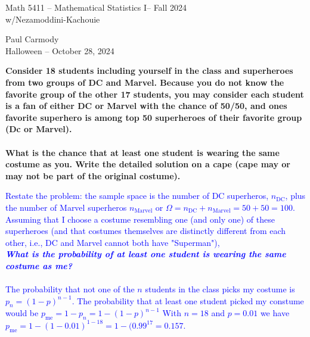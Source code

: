 \documentclass[10pt,a4paper]{report}
\newcommand{\CLASSNAME}{Math 5411 -- Mathematical Statistics I}
\newcommand{\PROFESSOR}{Nezamoddini-Kachouie}
\newcommand{\STUDENTNAME}{Paul Carmody}
\newcommand{\ASSIGNMENT}{Halloween }
\newcommand{\DUEDATE}{October 28, 2024}
\newcommand{\SEMESTER}{Fall 2024}
\newcommand{\BLUE}[1]{\textcolor{blue}{#1}}
\begin{document}
\begin{center}
	\Large{\CLASSNAME -- \SEMESTER} \\
	\large{w/\PROFESSOR}
\end{center}
\begin{center}
	\STUDENTNAME \\
	\ASSIGNMENT -- \DUEDATE\\
\end{center}
\noindent\textbf{Consider 18 students including yourself in the class and superheroes from two groups of DC and Marvel. Because you do not know the favorite group of the other 17 students, you may consider each student is a fan of either DC or Marvel with the chance of 50/50, and ones favorite superhero is among top 50 superheroes of their favorite group (Dc or Marvel). \\ \\
What is the chance that at least one student is wearing the same costume as you. Write the detailed solution on a cape (cape may or may not be part of the original costume).\\}

\BLUE{Restate the problem: the sample space is the number of DC superheros, $n_{\text{DC}}$, plus the number of Marvel superheros $n_{\text{Marvel}}$ or $\Omega =  n_{\text{DC}}+n_{\text{Marvel}} = 50 + 50 = 100$.  Assuming that I choose a costume resembling one (and only one) of these superheroes (and that costumes themselves are distinctly different from each other, i.e., DC and Marvel cannot both have "Superman"), \\ \textbf{\textit{What is the probability of at least one student is wearing the same costume as me?}}\\
\\
The probability that not one of the $n$ students in the class picks my costume is $p_n =(1-p)^{n-1}$.  
The probability that at least one student picked my constume would be $p_{\text{me}}=1-p_n=1-(1-p)^{n-1}$ With $n=18$ and $p=0.01$ we have $p_{\text{me}} = 1-(1-0.01)^{1-18}=1-(0.99^{17}=0.157.$
}
\end{document}
